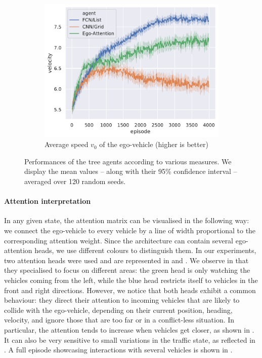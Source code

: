 \begin{figure}[htp]
	\begin{subfigure}[t]{0.49\linewidth}
		\includegraphics[width=\linewidth]{img/velocity}
		\caption{Average speed $v_0$ of the ego-vehicle (higher is better)}
		\label{fig:attention-velocity}
	\end{subfigure}
	\caption{Performances of the tree agents according to various measures. We display the mean values -- along with their 95\% confidence interval -- averaged over 120 random seeds.}
	\label{fig:attention-results}
\end{figure}

\paragraph{Attention interpretation}

In any given state, the attention matrix can be visualised in the following way: we connect the ego-vehicle to every vehicle by a line of width proportional to the corresponding attention weight. Since the architecture can contain several ego-attention heads, we use different colours to distinguish them. In our experiments, two attention heads were used and are represented in  and . We observe in  that they specialised to focus on different areas: the green head is only watching the vehicles coming from the left, while the blue head restricts itself to vehicles in the front and right directions. However, we notice that both heads exhibit a common behaviour: they direct their attention to incoming vehicles that are likely to collide with the ego-vehicle, depending on their current position, heading, velocity, and ignore those that are too far or in a conflict-less situation. In particular, the attention tends to increase when vehicles get closer, as shown in . It can also be very sensitive to small variations in the traffic state, as reflected in . A full episode showcasing interactions with several vehicles is shown in .



